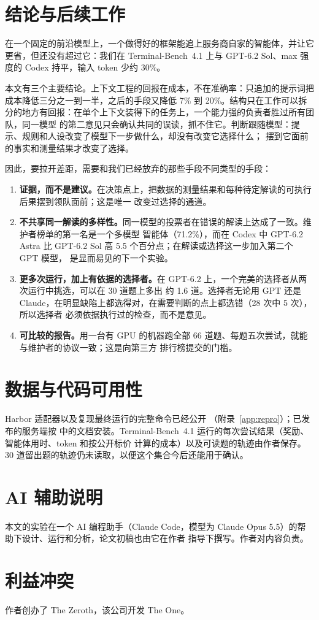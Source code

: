\section{结论与后续工作}
\label{sec:conclusion}

在一个固定的前沿模型上，一个做得好的框架能追上服务商自家的智能体，并让它更省，但还没有超过它：我们在
Terminal-Bench~4.1 上与 GPT-6.2 Sol、max 强度的 Codex 持平，输入 token 少约 30\%。

本文有三个主要结论。上下文工程的回报在成本，不在准确率：只追加的提示词把成本降低三分之一到一半，之后的手段又降低
7\% 到 20\%。结构只在工作可以拆分的地方有回报：在单个上下文装得下的任务上，一个能力强的负责者胜过所有团队，同一模型
的第二意见只会确认共同的误读，抓不住它。判断跟随模型：提示、规则和人设改变了模型下一步做什么，却没有改变它选择什么；
摆到它面前的事实和测量结果才改变了选择。

因此，要拉开差距，需要和我们已经放弃的那些手段不同类型的手段：
\begin{enumerate}[leftmargin=1.6em]
  \item \textbf{证据，而不是建议。}在决策点上，把数据的测量结果和每种待定解读的可执行后果摆到领队面前；这是唯一
    改变过选择的通道。
  \item \textbf{不共享同一解读的多样性。}同一模型的投票者在错误的解读上达成了一致。维护者榜单的第一名是一个多模型
    智能体（71.2\%），而在 Codex 中 GPT-6.2 Astra 比 GPT-6.2 Sol 高 5.5 个百分点；在解读或选择这一步加入第二个 GPT 模型，
    是显而易见的下一个实验。
  \item \textbf{更多次运行，加上有依据的选择者。}在 GPT-6.2 上，一个完美的选择者从两次运行中挑选，可以在 30 道题上多出
    约 1.6 道。选择者无论用 GPT 还是 Claude，在明显缺陷上都选得对，在需要判断的点上都选错（28 次中 5 次），所以选择者
    必须依据执行过的检查，而不是意见。
  \item \textbf{可比较的报告。}用一台有 GPU 的机器跑全部 66 道题、每题五次尝试，就能与维护者的协议一致；这是向第三方
    排行榜提交的门槛。
\end{enumerate}

\section*{数据与代码可用性}
Harbor 适配器以及复现最终运行的完整命令已经公开 \citep{zhang2026adapter}（附录~\ref{app:repro}）；已发布的服务端按
\citep{zeroth2026server} 中的文档安装。Terminal-Bench~4.1 运行的每次尝试结果（奖励、智能体用时、token 和按公开标价
计算的成本）以及可读题的轨迹由作者保存。30 道留出题的轨迹仍未读取，以便这个集合今后还能用于确认。

\section*{AI 辅助说明}
本文的实验在一个 AI 编程助手（Claude Code，模型为 Claude Opus 5.5）的帮助下设计、运行和分析，论文初稿也由它在作者
指导下撰写。作者对内容负责。

\section*{利益冲突}
作者创办了 The Zeroth，该公司开发 The One。
